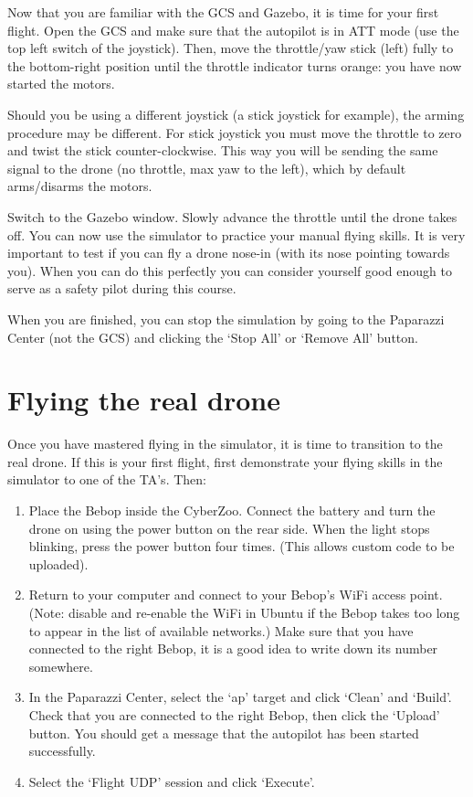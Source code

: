 Now that you are familiar with the GCS and Gazebo, it is time for your first flight.
Open the GCS and make sure that the autopilot is in ATT mode (use the top left switch of the joystick). Then, move the throttle/yaw stick (left) fully to the bottom-right position until the throttle indicator turns orange: you have now started the motors.

Should you be using a different joystick (a stick joystick for example), the arming procedure may be different. For stick joystick you must move the throttle to zero and twist the stick counter-clockwise. This way you will be sending the same signal to the drone (no throttle, max yaw to the left), which by default arms/disarms the motors.

Switch to the Gazebo window. Slowly advance the throttle until the drone takes off.
You can now use the simulator to practice your manual flying skills. It is very important to test if you can fly a drone nose-in (with its nose pointing towards you). When you can do this perfectly you can consider yourself good enough to serve as a safety pilot during this course.

When you are finished, you can stop the simulation by going to the Paparazzi Center (not the GCS) and clicking the `Stop All'  or `Remove All'  button.

\section{Flying the real drone}
Once you have mastered flying in the simulator, it is time to transition to the real drone.
If this is your first flight, first demonstrate your flying skills in the simulator to one of the TA's.
Then:

\begin{enumerate}
	\item Place the Bebop inside the CyberZoo. Connect the battery and turn the drone on using the power button on the rear side. When the light stops blinking, press the power button four times. (This allows custom code to be uploaded).
	\item Return to your computer and connect to your Bebop's WiFi access point. (Note: disable and re-enable the WiFi in Ubuntu if the Bebop takes too long to appear in the list of available networks.)
	Make sure that you have connected to the right Bebop, it is a good idea to write down its number somewhere.
	\item In the Paparazzi Center, select the `ap' target and click `Clean' and `Build'. Check that you are connected to the right Bebop, then click the `Upload' button. You should get a message that the autopilot has been started successfully.
	\item Select the `Flight UDP' session and click `Execute'.
\end{enumerate}

